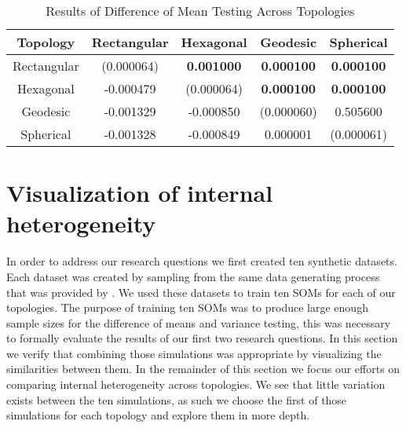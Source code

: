 \begin{table}
  \begin{minipage}{\textwidth}
  \caption{Results of Difference of Mean Testing Across Topologies}
  \label{rlt:all}
  \begin{tabular}{|c||c|c|c|c|}
  \hline
  \textbf{Topology}&Rectangular	&Hexagonal &Geodesic &Spherical\\\hline
  \hline
   Rectangular & (0.000064) & \textbf{0.001000} & \textbf{0.000100} & \textbf{0.000100}\\\hline
   Hexagonal & -0.000479 & (0.000064) & \textbf{0.000100} & \textbf{0.000100}\\\hline
   Geodesic & -0.001329 & -0.000850 & (0.000060) & 0.505600\\\hline
   Spherical & -0.001328 & -0.000849 & 0.000001 & (0.000061)\\\hline

  \end{tabular}
  \end{minipage}
\end{table}



\section{Visualization of internal heterogeneity}
\label{rdq3}
In order to address our research questions we first created ten synthetic
datasets.  Each dataset was created by sampling from the same data generating process
that was provided by \cite{wu2006}.  We used these datasets to train ten
SOMs for each of our topologies.  The purpose of training ten SOMs was to
produce large enough sample sizes for the difference of means and variance
testing, this was necessary to formally evaluate the results of our first two
research questions.  In this section we verify that combining those
simulations was appropriate by visualizing the similarities between them.
In the remainder of this section we focus our efforts on comparing internal
heterogeneity across
topologies.  We see that little variation exists between the ten
simulations, as such we choose the first of those simulations for each topology and
explore them in more depth.

